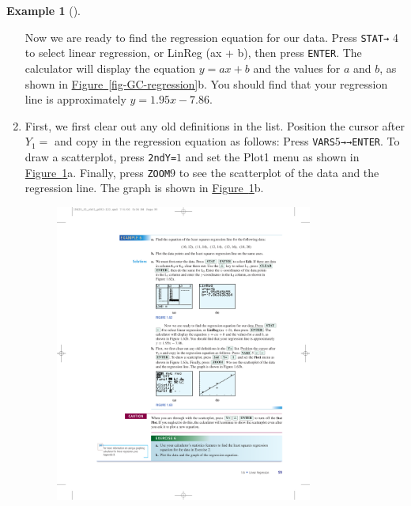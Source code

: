 \documentclass[10pt,]{book}
\theoremstyle{plain}
\theoremstyle{definition}
\theoremstyle{definition}
\newtheorem{example}[theorem]{Example}
\theoremstyle{definition}
\theoremstyle{definition}
\numberwithin{equation}{section}
\begin{document}
\begin{example}[]
\begin{enumerate}[label=*\alph**]
        Now we are ready to find the regression equation for our data. Press \lstinline?STAT?\lstinline?→? 4 to select linear regression, or LinReg (ax + b), then press \lstinline?ENTER?. The calculator will display the equation \(y = ax + b\) and the values for \(a\) and \(b\), as shown in \hyperref[fig-GC-regression]{Figure~\ref{fig-GC-regression}}b. You should find that your regression line is approximately \(y = 1.95x − 7.86\).\item\hypertarget{li-219}{}First, we first clear out any old definitions in the list. Position the cursor after \(Y_1 =\) and copy in the regression equation as follows: Press \lstinline?VARS?\(5\)\lstinline?→?\lstinline?→?\lstinline?ENTER?. To draw a scatterplot, press \lstinline?2nd?\lstinline?Y=?\(1\) and set the Plot1 menu as shown in \hyperref[fig-GC-regression2]{Figure~\ref{fig-GC-regression2}}a. Finally, press \lstinline?ZOOM?\(9\) to see the scatterplot of the data and the regression line. The graph is shown in \hyperref[fig-GC-regression2]{Figure~\ref{fig-GC-regression2}}b.
        \leavevmode%
\begin{figure}
\centering
\includegraphics[width=0.80\textwidth,]{images/fig-GC-regression2.pdf}\caption{\label{fig-GC-regression2}}
\end{figure}
\end{enumerate}
\end{example}
\typeout{************************************************}
\typeout{************************************************}
\end{document}
